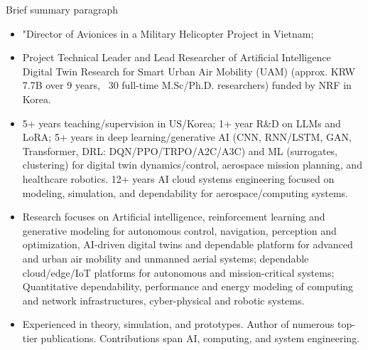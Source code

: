 \documentclass[a4paper,skipsamekey,11pt,english]{curve}
\begin{document}
{\small
\noindent
Brief summary paragraph
{\itshape\color{gray}%
\begin{itemize}
  \item "Director of Avionices in a Military Helicopter Project in Vietnam; 
  \item Project Technical Leader and Lead Researcher of Artificial Intelligence Digital Twin Research for Smart Urban Air Mobility (UAM) (approx. KRW 7.7B over 9 years, ~30 full-time M.Sc/Ph.D. researchers) funded by NRF in Korea. 
  \item 5+ years teaching/supervision in US/Korea; 1+ year R\&D on LLMs and LoRA; 5+ years in deep learning/generative AI (CNN, RNN/LSTM, GAN, Transformer, DRL: DQN/PPO/TRPO/A2C/A3C) and ML (surrogates, clustering) for digital twin dynamics/control, aerospace mission planning, and healthcare robotics. 12+ years AI cloud systems engineering focused on modeling, simulation, and dependability for aerospace/computing systems.  
  \item Research focuses on Artificial intelligence, reinforcement learning and generative modeling for autonomous control, navigation, perception and optimization, AI-driven digital twins and dependable platform for advanced and urban air mobility and unmanned aerial systems; dependable cloud/edge/IoT platforms for autonomous and mission-critical systems; Quantitative dependability, performance and energy modeling of computing and network infrastructures, cyber-physical and robotic systems.%
  \item Experienced in theory, simulation, and prototypes. Author of numerous top-tier publications. Contributions span AI, computing, and system engineering.
\end{itemize}
}
}



\newpage
{}
\end{document}
